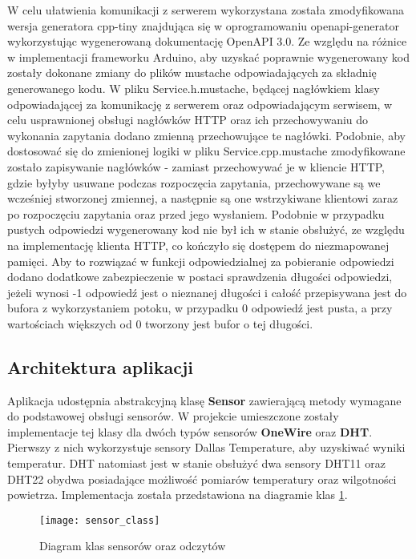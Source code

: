 W celu ułatwienia komunikacji z serwerem wykorzystana została zmodyfikowana wersja
generatora cpp-tiny znajdująca się w oprogramowaniu openapi-generator wykorzystując
wygenerowaną dokumentację OpenAPI 3.0. 
Ze względu na różnice w implementacji frameworku Arduino, aby uzyskać poprawnie 
wygenerowany kod zostały dokonane zmiany do plików mustache odpowiadających za składnię
generowanego kodu. W pliku Service.h.mustache, będącej nagłówkiem klasy odpowiadającej za komunikację z serwerem
oraz odpowiadającym serwisem, w celu usprawnionej obsługi nagłówków
HTTP oraz ich przechowywaniu do wykonania zapytania dodano zmienną przechowujące te nagłówki.
Podobnie, aby dostosować się do zmienionej logiki w pliku Service.cpp.mustache zmodyfikowane
zostało zapisywanie nagłówków - zamiast przechowywać je w kliencie HTTP, gdzie byłyby usuwane podczas
rozpoczęcia zapytania, przechowywane są we wcześniej stworzonej zmiennej, a następnie są one
wstrzykiwane klientowi zaraz po rozpoczęciu zapytania oraz przed jego wysłaniem.
Podobnie w przypadku pustych odpowiedzi wygenerowany kod nie był ich w stanie obsłużyć,
ze względu na implementację klienta HTTP, co kończyło się dostępem do niezmapowanej pamięci. 
Aby to rozwiązać w funkcji odpowiedzialnej 
za pobieranie odpowiedzi dodano dodatkowe zabezpieczenie w postaci sprawdzenia
długości odpowiedzi, jeżeli wynosi -1 odpowiedź jest o nieznanej długości i całość przepisywana jest
do bufora z wykorzystaniem potoku, w przypadku 0 odpowiedź jest pusta, a przy wartościach większych od
0 tworzony jest bufor o tej długości.

\subsection{Architektura aplikacji}
Aplikacja udostępnia abstrakcyjną klasę \textbf{Sensor} zawierającą metody wymagane do 
podstawowej obsługi sensorów. W projekcie umieszczone zostały implementacje tej klasy
dla dwóch typów sensorów \textbf{OneWire} oraz \textbf{DHT}. Pierwszy z nich wykorzystuje
sensory Dallas Temperature, aby uzyskiwać wyniki temperatur. DHT natomiast jest w stanie
obsłużyć dwa sensory DHT11 oraz DHT22 obydwa posiadające możliwość pomiarów temperatury oraz
wilgotności powietrza. Implementacja została przedstawiona na diagramie klas \ref{diagram:sensors}.
\begin{figure}[h!]
  \centering
  \texttt{[image: sensor\_class]}
  \caption{Diagram klas sensorów oraz odczytów}
  \label{diagram:sensors}
\end{figure}


